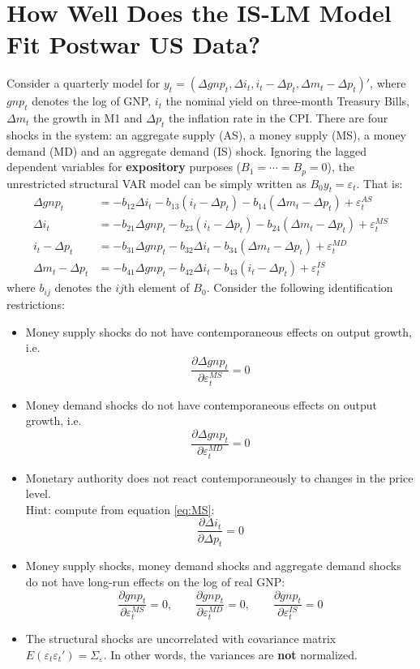 \section[How Well Does the IS-LM Model Fit Postwar US Data]{How Well Does the IS-LM Model Fit Postwar US Data?\label{ex:svarISLM}}
Consider a quarterly model for \(y_t = (\Delta gnp_t, \Delta i_t, i_t-\Delta p_t, \Delta m_t - \Delta p_t)'\),
  where \(gnp_t\) denotes the log of GNP, \(i_t\) the nominal yield on three-month Treasury Bills,
  \(\Delta m_t\) the growth in M1 and \(\Delta p_t\) the inflation rate in the CPI.
There are four shocks in the system: an aggregate supply (AS), a money supply (MS), a money demand (MD) and an aggregate demand (IS) shock.
Ignoring the lagged dependent variables for \textbf{expository} purposes (\(B_1=\cdots =B_p=0\)),
  the unrestricted structural VAR model can be simply written as \(B_0 y_t = \varepsilon_t\). That is:
\begin{align}
\Delta gnp_t &= -b_{12}\Delta i_t -b_{13}(i_t-\Delta p_t) -b_{14}(\Delta m_t-\Delta p_t) + \varepsilon_t^{AS} \label{eq:AS}\\
\Delta i_t &= -b_{21}\Delta gnp_t -b_{23}(i_t-\Delta p_t) -b_{24}(\Delta m_t-\Delta p_t) + \varepsilon_t^{MS} \label{eq:MS}\\
i_t - \Delta p_t &= -b_{31}\Delta gnp_t -b_{32}\Delta i_t -b_{34}(\Delta m_t-\Delta p_t) + \varepsilon_t^{MD} \label{eq:MD}\\
\Delta m_t - \Delta p_t &= -b_{41}\Delta gnp_t -b_{42}\Delta i_t - b_{43} (i_t-\Delta p_t) + \varepsilon_t^{IS} \label{eq:IS}
\end{align}
where \(b_{ij}\) denotes the \(ij\)th element of \(B_0\).
Consider the following identification restrictions:
\begin{itemize}
	\item Money supply shocks do not have contemporaneous effects on output growth, i.e.
	$$\frac{\partial \Delta gnp_t}{\partial \varepsilon_t^{MS}}=0$$	
	\item Money demand shocks do not have contemporaneous effects on output growth, i.e.
	$$\frac{\partial \Delta gnp_t}{\partial \varepsilon_t^{MD}}=0$$	
	\item Monetary authority does not react contemporaneously to changes in the price level.\\Hint: compute from equation \eqref{eq:MS}:
	$$\frac{\partial \Delta i_t}{\partial \Delta p_t}=0$$
	\item Money supply shocks, money demand shocks and aggregate demand shocks do not have long-run effects on the log of real GNP:	
	$$\frac{\partial gnp_t}{\partial \varepsilon_t^{MS}}=0,\qquad \frac{\partial gnp_t}{\partial \varepsilon_t^{MD}}=0,\qquad \frac{\partial gnp_t}{\partial \varepsilon_t^{IS}}=0$$	
	\item The structural shocks are uncorrelated with covariance matrix $E(\varepsilon_t \varepsilon_t')=\Sigma_\varepsilon$.
	In other words, the variances are \textbf{not} normalized.
\end{itemize}
